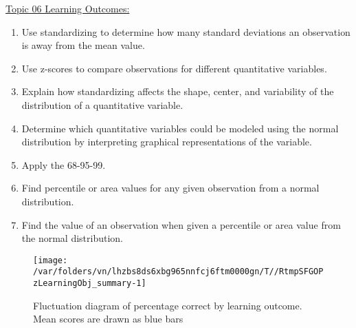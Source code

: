\documentclass[12pt,english,nohyper]{tufte-handout}\usepackage[]{graphicx}\usepackage[]{color}
\newenvironment{knitrout}{}{} %
\begin{document}
\noindent
\underline{Topic 06 Learning Outcomes:}
\vspace{2mm}

\begin{fullwidth}
\begin{enumerate}[label=\Alph*.,itemsep=-\parsep,leftmargin=*]
  \item
Use standardizing to determine how many standard deviations an observation is away from the mean value.
\item Use z-scores to compare observations for different quantitative variables.
\item Explain how standardizing affects the shape, center, and variability of the distribution of a quantitative variable.
\item Determine which quantitative variables could be modeled using the normal distribution by interpreting graphical representations of the variable.
\item Apply the 68-95-99.
\item Find percentile or area values for any given observation from a normal distribution.
\item Find the value of an observation when given a percentile or area value from the normal distribution.

\end{enumerate}
\end{fullwidth}

\begin{knitrout}
\color{fgcolor}\begin{figure}
\texttt{[image: /var/folders/vn/lhzbs8ds6xbg965nnfcj6ftm0000gn/T//RtmpSFGOPzLearningObj\_summary-1]} \caption[Fluctuation diagram of percentage correct by learning outcome]{Fluctuation diagram of percentage correct by learning outcome. Mean scores are drawn as blue bars}\label{fig:LearningObj_summary}
\end{figure}


\end{knitrout}

\vspace{5mm}
\end{document}
